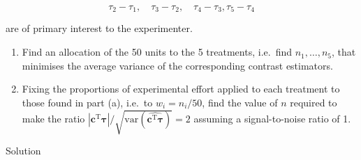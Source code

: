 \documentclass[
]{book}
\theoremstyle{definition}
\theoremstyle{definition}
\theoremstyle{definition}
\theoremstyle{definition}
\theoremstyle{remark}
\begin{document}
\[
\tau_2 - \tau_1, \quad \tau_3 - \tau_2, \quad \tau_4 - \tau_3, \tau_5 - \tau_4
\]

are of primary interest to the experimenter.

\begin{enumerate}
\def\labelenumi{\alph{enumi}.}
\item
  Find an allocation of the 50 units to the 5 treatments, i.e.~find \(n_1, \ldots, n_5\), that minimises the average variance of the corresponding contrast estimators.
\item
  Fixing the proportions of experimental effort applied to each treatment to those found in part (a), i.e.~to \(w_i = n_i/50\), find the value of \(n\) required to make the ratio \(|\boldsymbol{c}^{\mathrm{T}}\boldsymbol{\tau}|/\sqrt{\mbox{var}\left(\widehat{\boldsymbol{c}^{\mathrm{T}}\boldsymbol{\tau}}\right)} = 2\) assuming a signal-to-noise ratio of 1.
\end{enumerate}

Solution
\end{document}
